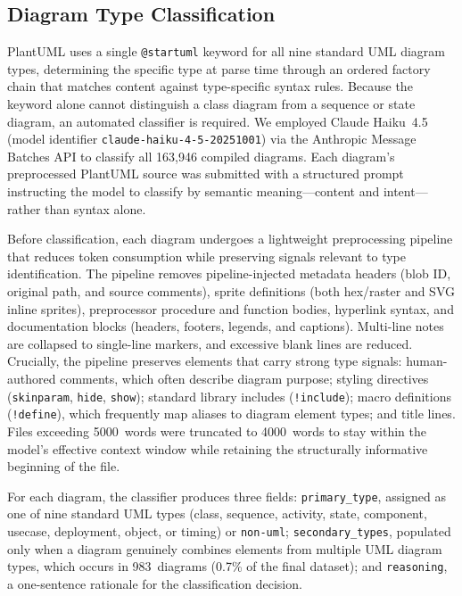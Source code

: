\documentclass[data,datadescriptor,submit,pdftex,moreauthors]{Definitions/mdpi}
\begin{document}
\subsection{Diagram Type Classification}
\label{sec:classification}

PlantUML uses a single \texttt{@startuml} keyword for all nine standard UML diagram types, determining the specific type at parse time through an ordered factory chain that matches content against type-specific syntax rules. Because the keyword alone cannot distinguish a class diagram from a sequence or state diagram, an automated classifier is required. We employed Claude Haiku~4.5 (model identifier \texttt{claude-haiku-4-5-20251001}) via the Anthropic Message Batches API to classify all 163,946 compiled diagrams. Each diagram's preprocessed PlantUML source was submitted with a structured prompt instructing the model to classify by semantic meaning---content and intent---rather than syntax alone.

Before classification, each diagram undergoes a lightweight preprocessing pipeline that reduces token consumption while preserving signals relevant to type identification. The pipeline removes pipeline-injected metadata headers (blob ID, original path, and source comments), sprite definitions (both hex/raster and SVG inline sprites), preprocessor procedure and function bodies, hyperlink syntax, and documentation blocks (headers, footers, legends, and captions). Multi-line notes are collapsed to single-line markers, and excessive blank lines are reduced. Crucially, the pipeline preserves elements that carry strong type signals: human-authored comments, which often describe diagram purpose; styling directives (\texttt{skinparam}, \texttt{hide}, \texttt{show}); standard library includes (\texttt{!include}); macro definitions (\texttt{!define}), which frequently map aliases to diagram element types; and title lines. Files exceeding 5000~words were truncated to 4000~words to stay within the model's effective context window while retaining the structurally informative beginning of the file.

For each diagram, the classifier produces three fields: \texttt{primary\_type}, assigned as one of nine standard UML types (class, sequence, activity, state, component, usecase, deployment, object, or timing) or \texttt{non-uml}; \texttt{secondary\_types}, populated only when a diagram genuinely combines elements from multiple UML diagram types, which occurs in 983~diagrams (0.7\% of the final dataset); and \texttt{reasoning}, a one-sentence rationale for the classification decision.
\end{document}

